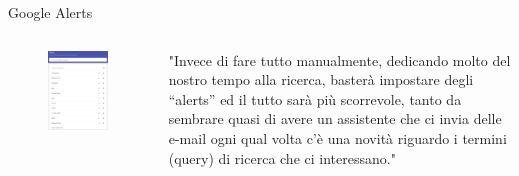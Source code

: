 \documentclass{beamer}
\begin{document}
\begin{frame}{Google Alerts}
\begin{columns}
\begin{column}{0.5\linewidth}
\begin{figure}[h!]
\includegraphics[height=0.8\textheight]{immagini/alert.png}
\end{figure}
\end{column}
\begin{column}{0.5\linewidth}
"Invece di fare tutto manualmente, dedicando molto del nostro tempo alla ricerca, basterà impostare degli “alerts” ed il tutto sarà più scorrevole, tanto da sembrare quasi di avere un assistente che ci invia delle e-mail ogni qual volta c’è una novità riguardo i termini (query) di ricerca che ci interessano."
\end{column}
\end{columns}
\end{frame}
\end{document}
